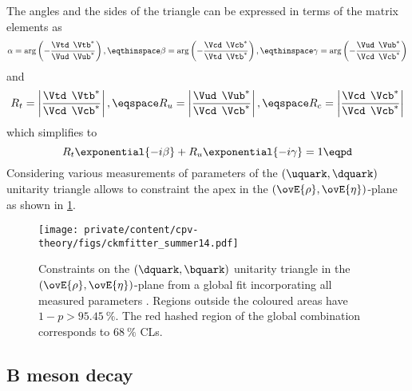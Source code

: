 The angles and the sides of the triangle can be expressed in terms of the matrix
elements as
%
\begin{equation}
  \alpha = \arg\left(-\frac{\Vtd^{\phantom{\ast}}\Vtb^{\ast}}{\Vud^{\phantom{\ast}}\Vub^{\ast}}\right),\eqthinspace 
  \beta =  \arg\left(-\frac{\Vcd^{\phantom{\ast}}\Vcb^{\ast}}{\Vtd^{\phantom{\ast}}\Vtb^{\ast}}\right),\eqthinspace 
  \gamma = \arg\left(-\frac{\Vud^{\phantom{\ast}}\Vub^{\ast}}{\Vcd^{\phantom{\ast}}\Vcb^{\ast}}\right)
\end{equation}
%
and
%
\begin{equation}
  R_t = \left| \frac{\Vtd^{\phantom{\ast}}\Vtb^{\ast}}{\Vcd^{\phantom{\ast}}\Vcb^{\ast}} \right|,\eqspace
  R_u = \left| \frac{\Vud^{\phantom{\ast}}\Vub^{\ast}}{\Vcd^{\phantom{\ast}}\Vcb^{\ast}} \right|,\eqspace
  R_c = \left| \frac{\Vcd^{\phantom{\ast}}\Vcb^{\ast}}{\Vcd^{\phantom{\ast}}\Vcb^{\ast}} \right|
\end{equation}
%
which simplifies to
%
\begin{equation}
  R_t \exponential{-i\beta} + R_u \exponential{-i\gamma} = 1 \eqpd
\end{equation}
%
Considering various measurements of parameters of the ${(\uquark,\dquark)}$
unitarity triangle allows to constraint the apex in the
${(\ovE{\rho},\ovE{\eta})}$-plane \cite{Charles:2004jd,Bona:2006ah} as shown in
\cref{fig:cpv_theory:flavour_physics:ckm_matrix:ckm_fitter_14}.

\begin{figure}[ht]
\centering
\texttt{[image: private/content/cpv-theory/figs/ckmfitter\_summer14.pdf]}
\caption{Constraints on the ${(\dquark,\bquark)}$ unitarity triangle in the
${(\ovE{\rho},\ovE{\eta})}$-plane from a global fit incorporating all measured
\CKM parameters \cite{Charles:2004jd}. Regions outside the coloured areas have
$1-p > \SI{95.45}{\percent}$. The red hashed region of the global combination
corresponds to $\SI{68}{\percent}$ \acp{CL}.}
\label{fig:cpv_theory:flavour_physics:ckm_matrix:ckm_fitter_14}
\end{figure}

\subsection{B meson decay}
\label{sec:cpv_theory:flavour_physics:bdecays}

